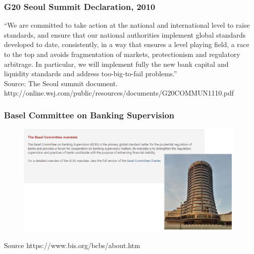 \documentclass[11pt]{beamer}
\begin{document}
\begin{frame}
\frametitle{G20 Seoul Summit Declaration, 2010}
“We are committed to take action at the national and international level to raise standards, and ensure that our national authorities implement global standards developed to date, consistently, in a way that ensures a level playing field, a race to the top and avoids fragmentation of markets, protectionism and regulatory arbitrage. In particular, we will implement fully the new bank capital and liquidity standards and address too-big-to-fail problems.”\\
\tiny{Source: The Seoul summit document. http://online.wsj.com/public/resources/documents/G20COMMUN1110.pdf}


\end{frame}
\begin{frame}
\frametitle{Basel Committee on Banking Supervision}
\begin{figure}
\includegraphics[width=1 \textwidth]{BCBS1.png}
\end{figure}
\tiny{Source https://www.bis.org/bcbs/about.htm}
\end{frame}
\end{document}
